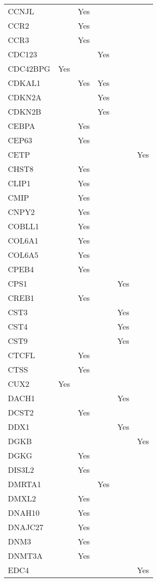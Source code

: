 \documentclass[]{report}
\begin{document}
\begin{appendices}
\begin{longtable}[t]{llllll}
CCNJL &  & Yes &  &  & \\
CCR2 &  & Yes &  &  & \\
CCR3 &  & Yes &  &  & \\
CDC123 &  &  & Yes &  & \\
CDC42BPG & Yes &  &  &  & \\
CDKAL1 &  & Yes & Yes &  & \\
CDKN2A &  &  & Yes &  & \\
CDKN2B &  &  & Yes &  & \\
CEBPA &  & Yes &  &  & \\
CEP63 &  & Yes &  &  & \\
CETP &  &  &  &  & Yes\\
CHST8 &  & Yes &  &  & \\
CLIP1 &  & Yes &  &  & \\
CMIP &  & Yes &  &  & \\
CNPY2 &  & Yes &  &  & \\
COBLL1 &  & Yes &  &  & \\
COL6A1 &  & Yes &  &  & \\
COL6A5 &  & Yes &  &  & \\
CPEB4 &  & Yes &  &  & \\
CPS1 &  &  &  & Yes & \\
CREB1 &  & Yes &  &  & \\
CST3 &  &  &  & Yes & \\
CST4 &  &  &  & Yes & \\
CST9 &  &  &  & Yes & \\
CTCFL &  & Yes &  &  & \\
CTSS &  & Yes &  &  & \\
CUX2 & Yes &  &  &  & \\
DACH1 &  &  &  & Yes & \\
DCST2 &  & Yes &  &  & \\
DDX1 &  &  &  & Yes & \\
DGKB &  &  &  &  & Yes\\
DGKG &  & Yes &  &  & \\
DIS3L2 &  & Yes &  &  & \\
DMRTA1 &  &  & Yes &  & \\
DMXL2 &  & Yes &  &  & \\
DNAH10 &  & Yes &  &  & \\
DNAJC27 &  & Yes &  &  & \\
DNM3 &  & Yes &  &  & \\
DNMT3A &  & Yes &  &  & \\
EDC4 &  &  &  &  & Yes\\

\end{longtable}
\end{appendices}
\end{document}

